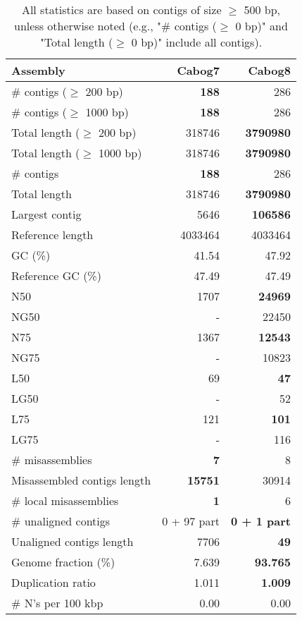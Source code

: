 \documentclass[12pt,a4paper]{article}
\begin{document}
\begin{table}[ht]
\begin{center}
\caption{All statistics are based on contigs of size $\geq$ 500 bp, unless otherwise noted (e.g., "\# contigs ($\geq$ 0 bp)" and "Total length ($\geq$ 0 bp)" include all contigs).}
\begin{tabular}{|l*{2}{|r}|}
\hline
Assembly & Cabog7 & Cabog8 \\ \hline
\# contigs ($\geq$ 200 bp) & {\bf 188} & 286 \\ \hline
\# contigs ($\geq$ 1000 bp) & {\bf 188} & 286 \\ \hline
Total length ($\geq$ 200 bp) & 318746 & {\bf 3790980} \\ \hline
Total length ($\geq$ 1000 bp) & 318746 & {\bf 3790980} \\ \hline
\# contigs & {\bf 188} & 286 \\ \hline
Total length & 318746 & {\bf 3790980} \\ \hline
Largest contig & 5646 & {\bf 106586} \\ \hline
Reference length & 4033464 & 4033464 \\ \hline
GC (\%) & 41.54 & 47.92 \\ \hline
Reference GC (\%) & 47.49 & 47.49 \\ \hline
N50 & 1707 & {\bf 24969} \\ \hline
NG50 & - & 22450 \\ \hline
N75 & 1367 & {\bf 12543} \\ \hline
NG75 & - & 10823 \\ \hline
L50 & 69 & {\bf 47} \\ \hline
LG50 & - & 52 \\ \hline
L75 & 121 & {\bf 101} \\ \hline
LG75 & - & 116 \\ \hline
\# misassemblies & {\bf 7} & 8 \\ \hline
Misassembled contigs length & {\bf 15751} & 30914 \\ \hline
\# local misassemblies & {\bf 1} & 6 \\ \hline
\# unaligned contigs & 0 + 97 part & {\bf 0 + 1 part} \\ \hline
Unaligned contigs length & 7706 & {\bf 49} \\ \hline
Genome fraction (\%) & 7.639 & {\bf 93.765} \\ \hline
Duplication ratio & 1.011 & {\bf 1.009} \\ \hline
\# N's per 100 kbp & 0.00 & 0.00 \\ \hline

\end{tabular}
\end{center}
\end{table}
\end{document}
